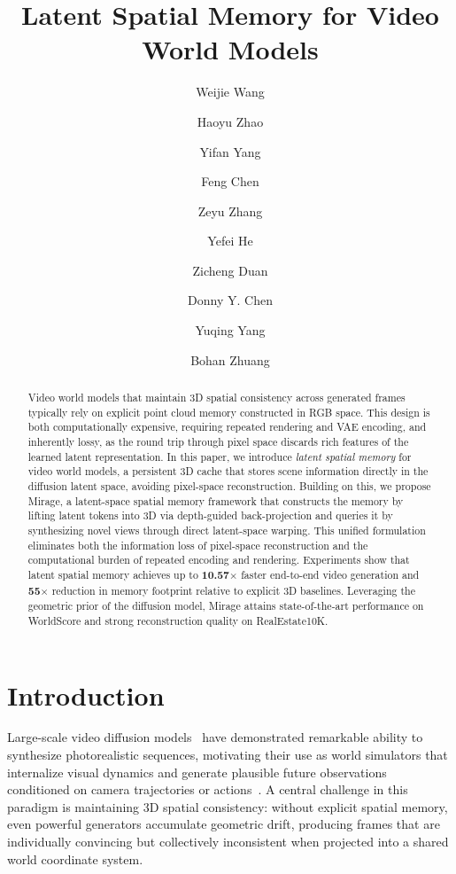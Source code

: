 \documentclass{llmxive}
\title{Latent Spatial Memory for Video World Models}
\author{Weijie Wang \and Haoyu Zhao \and Yifan Yang \and Feng Chen \and Zeyu Zhang \and Yefei He \and Zicheng Duan \and Donny Y. Chen \and Yuqing Yang \and Bohan Zhuang}
\begin{document}
\maketitle
\begin{abstract}
Video world models that maintain 3D spatial consistency across generated frames typically rely on explicit point cloud memory constructed in RGB space. This design is both computationally expensive, requiring repeated rendering and VAE encoding, and inherently lossy, as the round trip through pixel space discards rich features of the learned latent representation. In this paper, we introduce \emph{latent spatial memory} for video world models, a persistent 3D cache that stores scene information directly in the diffusion latent space, avoiding pixel-space reconstruction. Building on this, we propose Mirage, a latent-space spatial memory framework that constructs the memory by lifting latent tokens into 3D via depth-guided back-projection and queries it by synthesizing novel views through direct latent-space warping.  This unified formulation eliminates both the information loss of pixel-space reconstruction and the computational burden of repeated encoding and rendering. Experiments show that latent spatial memory achieves up to \textbf{10.57}$\times$ faster end-to-end video generation and \textbf{55}$\times$ reduction in memory footprint relative to explicit 3D baselines. Leveraging the geometric prior of the diffusion model, Mirage attains state-of-the-art performance on WorldScore and strong reconstruction quality on RealEstate10K.
\end{abstract}
\section{Introduction}

Large-scale video diffusion models~\cite{sora,wan2025wan,kong2024hunyuanvideo,yang2024cogvideox,blattmann2023stable} have demonstrated remarkable ability to synthesize photorealistic sequences, motivating their use as world simulators that internalize visual dynamics and generate plausible future observations conditioned on camera trajectories or actions~\cite{bruce2024genie,parkerholder2024genie2,valevski2024diffusion,alonso2024diffusion,che2024gamegen}. A central challenge in this paradigm is maintaining 3D spatial consistency: without explicit spatial memory, even powerful generators accumulate geometric drift, producing frames that are individually convincing but collectively inconsistent when projected into a shared world coordinate system.
\end{document}
